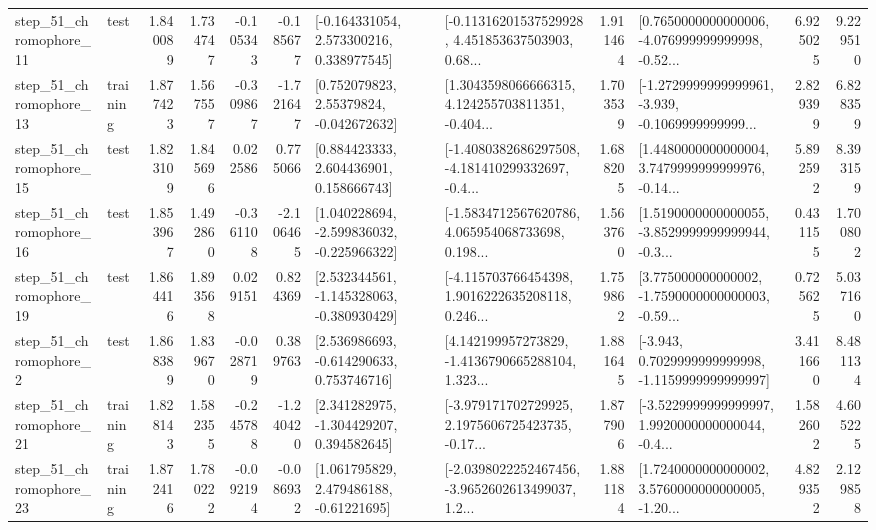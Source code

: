 \begin{tabular}{llrrrrllrlrr}
   step\_51\_chromophore\_11 &      test &      1.840089 &    1.734747 &     -0.105343 & -0.185677 &    [-0.164331054, 2.573300216, 0.338977545] &  [-0.11316201537529928, 4.451853637503903, 0.68... &       1.911464 &  [0.7650000000000006, -4.076999999999998, -0.52... &            6.925025 &          9.229510 \\
   step\_51\_chromophore\_13 &  training &      1.877423 &    1.567557 &     -0.309867 & -1.721647 &     [0.752079823, 2.55379824, -0.042672632] &  [1.3043598066666315, 4.124255703811351, -0.404... &       1.703539 &  [-1.2729999999999961, -3.939, -0.1069999999999... &            2.829399 &          6.828359 \\
   step\_51\_chromophore\_15 &      test &      1.823109 &    1.845696 &      0.022586 &  0.775066 &     [0.884423333, 2.604436901, 0.158666743] &  [-1.4080382686297508, -4.181410299332697, -0.4... &       1.688205 &  [1.4480000000000004, 3.7479999999999976, -0.14... &            5.892592 &          8.393159 \\
   step\_51\_chromophore\_16 &      test &      1.853967 &    1.492860 &     -0.361108 & -2.106465 &   [1.040228694, -2.599836032, -0.225966322] &  [-1.5834712567620786, 4.065954068733698, 0.198... &       1.563760 &  [1.5190000000000055, -3.8529999999999944, -0.3... &            0.431155 &          1.700802 \\
   step\_51\_chromophore\_19 &      test &      1.864416 &    1.893568 &      0.029151 &  0.824369 &   [2.532344561, -1.145328063, -0.380930429] &  [-4.115703766454398, 1.9016222635208118, 0.246... &       1.759862 &  [3.775000000000002, -1.7590000000000003, -0.59... &            0.725625 &          5.037160 \\
    step\_51\_chromophore\_2 &      test &      1.868389 &    1.839670 &     -0.028719 &  0.389763 &    [2.536986693, -0.614290633, 0.753746716] &  [4.142199957273829, -1.4136790665288104, 1.323... &       1.881645 &  [-3.943, 0.7029999999999998, -1.1159999999999997] &            3.411660 &          8.481134 \\
   step\_51\_chromophore\_21 &  training &      1.828143 &    1.582355 &     -0.245788 & -1.240420 &    [2.341282975, -1.304429207, 0.394582645] &  [-3.979171702729925, 2.1975606725423735, -0.17... &       1.877906 &  [-3.5229999999999997, 1.9920000000000044, -0.4... &            1.582602 &          4.605225 \\
   step\_51\_chromophore\_23 &  training &      1.872416 &    1.780222 &     -0.092194 & -0.086932 &     [1.061795829, 2.479486188, -0.61221695] &  [-2.0398022252467456, -3.9652602613499037, 1.2... &       1.881184 &  [1.7240000000000002, 3.5760000000000005, -1.20... &            4.829352 &          2.129858 \\

\end{tabular}
